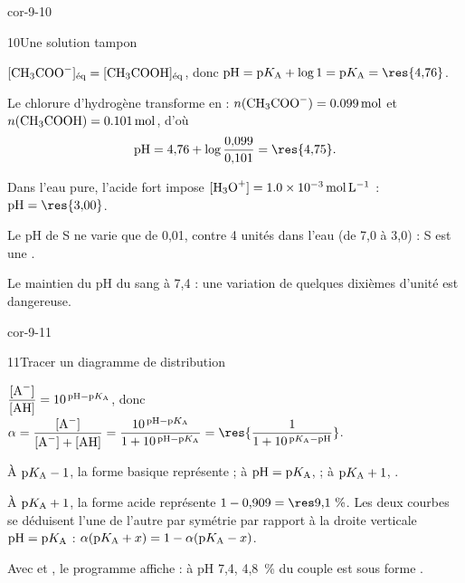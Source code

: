 \begin{blocLivre}{cor-9-10}
\begin{corrige}{10}{Une solution tampon}
\begin{questions}
\item $[\ce{CH3COO-}]_\text{éq}=[\ce{CH3COOH}]_\text{éq}$, donc $\pH=\pKa+\log1=\pKa=\res{4{,}76}$.
\item Le chlorure d'hydrogène transforme  en  :
$n(\ce{CH3COO-})=\qty{0,099}{mol}$ et $n(\ce{CH3COOH})=\qty{0,101}{mol}$, d'où
\[\pH=4{,}76+\log\frac{0{,}099}{0{,}101}=\res{4{,}75}.\]
\item Dans l'eau pure, l'acide fort impose $[\ce{H3O+}]=\qty{1,0e-3}{mol.L^{-1}}$ : $\pH=\res{3{,}00}$.
\item Le pH de S ne varie que de 0,01, contre 4 unités dans l'eau (de 7,0 à 3,0) : S est une
.
\item Le maintien du pH du sang à 7,4 : une variation de quelques dixièmes d'unité est dangereuse.
\end{questions}
\end{corrige}
\end{blocLivre}
\begin{blocLivre}{cor-9-11}
\begin{corrige}{11}{Tracer un diagramme de distribution}
\begin{questions}
\item $\dfrac{[\ce{A-}]}{[\ce{AH}]}=10^{\,\pH-\pKa}$, donc
$\alpha=\dfrac{[\ce{A-}]}{[\ce{A-}]+[\ce{AH}]}=\dfrac{10^{\,\pH-\pKa}}{1+10^{\,\pH-\pKa}}=\res{\dfrac{1}{1+10^{\,\pKa-\pH}}}$.
\item À $\mathrm{p}K_{\mathrm{A}}-1$, la forme basique représente  ; à $\mathrm{pH}=\mathrm{p}K_{\mathrm{A}}$,  ; à $\mathrm{p}K_{\mathrm{A}}+1$,
.
\item À $\mathrm{p}K_{\mathrm{A}}+1$, la forme acide représente $1-0{,}909=\res{9{,}1~\%}$. Les deux courbes se déduisent l'une de
l'autre par symétrie par rapport à la droite verticale $\mathrm{pH}=\mathrm{p}K_{\mathrm{A}}$ : $\alpha(\mathrm{p}K_{\mathrm{A}}+x)=1-\alpha(\mathrm{p}K_{\mathrm{A}}-x)$.
\item Avec  et , le programme affiche  : à
pH 7,4, 4,8~\% du couple est sous forme .
\end{questions}
\end{corrige}
\end{blocLivre}
